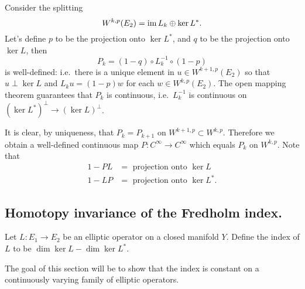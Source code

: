   \begin{example}
   Consider the splitting
   \begin{equation*}
     W^{k,p}(E_{2})=\operatorname{\mathrm{im}} L_{k}\oplus \ker L^{*}.
   \end{equation*}
   Let's define $p$ to be the projection onto $\ker L^{*}$, and $q$
   to be the projection onto $\ker L$, then
   \begin{equation*}
     P_{k}=(1-q)\circ L_{k}^{-1}\circ (1-p)
   \end{equation*}
   is well-defined: i.e.\ there is a unique element in
   $u\in W^{k+1,p}(E_{2})$ so that $u\perp \ker L$ and $L_{k}u=(1-p)w$
   for each $w\in W^{k,p}(E_{2})$. The open mapping theorem guarantees
   that $P_{k}$ is continuous, i.e.\ $L_{k}^{-1}$ is continuous on
   $(\ker L^{*})^{\perp}\to (\ker L)^{\perp}$.

   It is clear, by uniqueness, that $P_{k}=P_{k+1}$ on $W^{k+1,p}\subset
   W^{k,p}$. Therefore we obtain a well-defined continuous map
   $P:C^{\infty}\to C^{\infty}$ which equals $P_{k}$ on
   $W^{k,p}$. Note that
   \begin{equation*}
     \begin{aligned}
       1-PL&=\text{ projection onto $\ker L$}\\
       1-LP&=\text{ projection onto $\ker L^{*}$}.
     \end{aligned}
   \end{equation*}
 \end{example}
 \subsection*{Homotopy invariance of the Fredholm index.}
 Let $L:E_{1}\to E_{2}$ be an elliptic operator on a closed manifold
 $Y$. Define the index of $L$ to be $\dim \ker L-\dim \ker L^{*}$.

 The goal of this section will be to show that the index is
 constant on a continuously varying family of elliptic operators.

